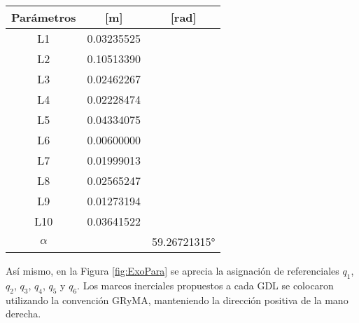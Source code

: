 \begin{table}[!ht] %
    \centering
    \begin{center}
        \begin{tabular}{ccc}
            Parámetros & [m] & [rad] \\
            \hline \hline 
            L1 & 0.03235525 & \\ 
            L2 & 0.10513390 & \\
            L3 & 0.02462267 & \\
            L4 & 0.02228474 & \\
            L5 & 0.04334075 & \\
            L6 & 0.00600000 & \\
            L7 & 0.01999013 & \\
            L8 & 0.02565247 & \\
            L9 & 0.01273194 & \\
            L10 & 0.03641522 & \\
            $\alpha$ &  & 59.26721315°\\
        \end{tabular}
    \end{center}
\end{table}
Así mismo, en la Figura \ref{fig:ExoPara} se aprecia la asignación de referenciales $q_1$, $q_2$, $q_3$, $q_4$, $q_5$
y $q_6$. Los marcos inerciales propuestos a cada GDL se colocaron utilizando la convención GRyMA, manteniendo la
dirección positiva de la mano derecha.
    
